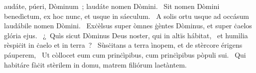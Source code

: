 \psalmChapterWithInscription{}
{ }
{%
audáte, púeri, Dòminum~; laudáte nomen Dòmini. 
~Sit nomen Dòmini benedìctum, ex hoc nunc, et usque in sáeculum. 
~A solis ortu usque ad occásum laudábile nomen Dòmini. 
~Exċèlsus super òmnes ġèntes Dòminus, et super ċaelos glória ejus. 
~¿~Quìs sicut Dòminus Deus noster, qui in altïs hábitat, 
~et humìlia rèspiċit in ċaelo et in terra~? 
~Sùsċitans a terra ìnopem, et de stèrcore érigens páuperem, 
~Ut còllocet eum cum prinċìpibus, cum prinċìpibus pòpuli sui. 
~Qui habitáre fàċit stèrilem in domu, matrem filiórum laetàntem. 
}
